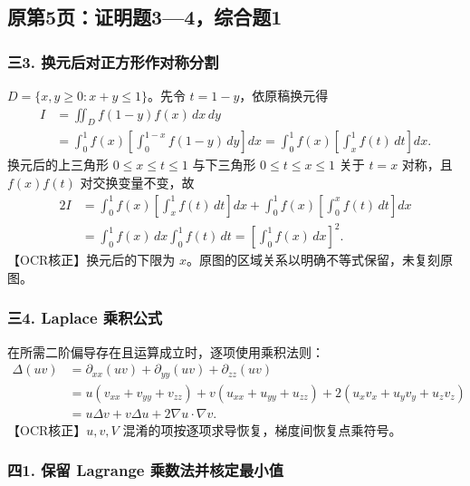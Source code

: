 \documentclass[11pt,fontset=fandol]{ctexart}
\begin{document}
\subsection{原第5页：证明题3---4，综合题1}\label{ux539fux7b2c5ux9875ux8bc1ux660eux989834ux7efcux5408ux98981}

\subsubsection{三3.
换元后对正方形作对称分割}\label{ux4e093.-ux6362ux5143ux540eux5bf9ux6b63ux65b9ux5f62ux4f5cux5bf9ux79f0ux5206ux5272}

\(D=\{x,y\ge0:x+y\le1\}\)。先令 \(t=1-y\)，依原稿换元得 \[
\begin{aligned}
I&=\iint_Df(1-y)f(x)\,dx\,dy\\
&=\int_0^1f(x)\left[\int_0^{1-x}f(1-y)\,dy\right]dx
=\int_0^1f(x)\left[\int_x^1f(t)\,dt\right]dx.
\end{aligned}
\] 换元后的上三角形 \(0\le x\le t\le1\) 与下三角形 \(0\le t\le x\le1\)
关于 \(t=x\) 对称，且 \(f(x)f(t)\) 对交换变量不变，故 \[
\begin{aligned}
2I&=\int_0^1f(x)\left[\int_x^1f(t)\,dt\right]dx
+\int_0^1f(x)\left[\int_0^xf(t)\,dt\right]dx\\
&=\int_0^1f(x)\,dx\int_0^1f(t)\,dt
=\left[\int_0^1f(x)\,dx\right]^2.
\end{aligned}
\] 【OCR核正】换元后的下限为
\(x\)。原图的区域关系以明确不等式保留，未复刻原图。

\subsubsection{三4. Laplace
乘积公式}\label{ux4e094.-laplace-ux4e58ux79efux516cux5f0f}

在所需二阶偏导存在且运算成立时，逐项使用乘积法则： \[
\begin{aligned}
\Delta(uv)
&=\partial_{xx}(uv)+\partial_{yy}(uv)+\partial_{zz}(uv)\\
&=u(v_{xx}+v_{yy}+v_{zz})+v(u_{xx}+u_{yy}+u_{zz})
+2(u_xv_x+u_yv_y+u_zv_z)\\
&=u\Delta v+v\Delta u+2\nabla u\cdot\nabla v.
\end{aligned}
\] 【OCR核正】\(u,v,V\) 混淆的项按逐项求导恢复，梯度间恢复点乘符号。

\subsubsection{四1. 保留 Lagrange
乘数法并核定最小值}\label{ux56db1.-ux4fddux7559-lagrange-ux4e58ux6570ux6cd5ux5e76ux6838ux5b9aux6700ux5c0fux503c}
\end{document}
